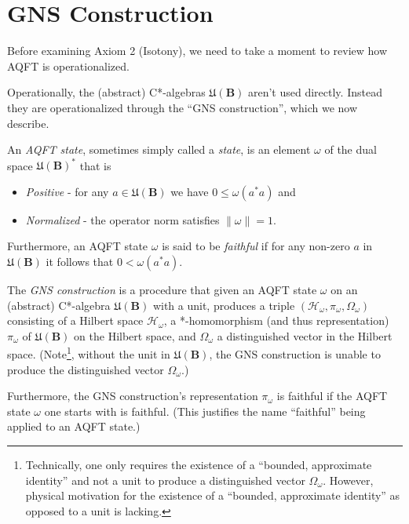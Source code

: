 \section{GNS Construction}\label{sctn:gns-construction}
Before examining Axiom 2 (Isotony), we need to take a moment to review how AQFT is operationalized.

Operationally, the (abstract) C*-algebras $\mathfrak{U}(\mathbf{B})$ aren't used directly. Instead they are operationalized through the ``GNS construction'', which we now describe.

An \textit{AQFT state}, sometimes simply called a \textit{state}, is an element $\omega$ of the dual space $\mathfrak{U}(\mathbf{B})^*$ that is

\begin{itemize}
    \item \textit{Positive} - for any $a \in \mathfrak{U}(\mathbf{B})$ we have $0 \le \omega(a^*a)$ and
    \item \textit{Normalized} - the operator norm satisfies $\| \omega \|=1$.
\end{itemize}

Furthermore, an AQFT state $\omega$ is said to be \textit{faithful} if for any non-zero $a$ in $\mathfrak{U}(\mathbf{B})$ it follows that $0 < \omega(a^*a)$.

The \textit{GNS construction} is a procedure that given an AQFT state $\omega$ on an (abstract) C*-algebra $\mathfrak{U}(\mathbf{B})$ with a unit, produces a triple $(\mathcal{H}_\omega, \pi_\omega, \Omega_\omega)$ consisting of a Hilbert space $\mathcal{H}_\omega$, a *-homomorphism (and thus representation) $\pi_\omega$ of $\mathfrak{U}(\mathbf{B})$ on the Hilbert space, and $\Omega_\omega$ a distinguished vector in the Hilbert space. (Note\footnote{Technically, one only requires the existence of a ``bounded, approximate identity'' and not a unit to produce a distinguished vector $\Omega_\omega$. However, physical motivation for the existence of a ``bounded, approximate identity'' as opposed to a unit is lacking.}, without the unit in $\mathfrak{U}(\mathbf{B})$, the GNS construction is unable to produce the distinguished vector $\Omega_\omega$.)

Furthermore, the GNS construction's representation $\pi_\omega$ is faithful if the AQFT state $\omega$ one starts with is faithful. (This justifies the name ``faithful'' being applied to an AQFT state.)

